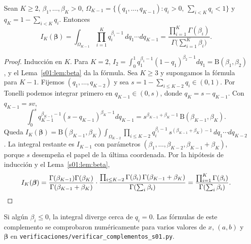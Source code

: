 \begin{teorema}\label{s01:teo:dirint}
Sean $K\ge2$, $\beta_1,\ldots,\beta_K>0$, $\Omega_{K-1}=\{(q_1,\ldots,q_{K-1}):
q_i>0,\ \sum_{i<K}q_i<1\}$ y $q_K=1-\sum_{i<K}q_i$. Entonces
\[
I_K(\boldsymbol\beta)=\int_{\Omega_{K-1}}\prod_{i=1}^Kq_i^{\beta_i-1}\,dq_1\cdots dq_{K-1}
=\frac{\prod_{i=1}^K\Gamma(\beta_i)}{\Gamma\bigl(\sum_{i=1}^K\beta_i\bigr)}.
\]
\end{teorema}
\begin{proof}
Inducción en $K$. Para $K=2$, $I_2=\int_0^1q_1^{\beta_1-1}(1-q_1)^{\beta_2-1}dq_1
=\mathrm B(\beta_1,\beta_2)$, y el Lema~\ref{s01:lem:beta} da la fórmula.
Sea $K\ge3$ y supongamos la fórmula para $K-1$. Fijemos $(q_1,\ldots,q_{K-2})$ y
sea $s=1-\sum_{i\le K-2}q_i\in(0,1)$. Por Tonelli podemos integrar primero en
$q_{K-1}\in(0,s)$, donde $q_K=s-q_{K-1}$. Con $q_{K-1}=sv$,
\[
\int_0^sq_{K-1}^{\beta_{K-1}-1}(s-q_{K-1})^{\beta_K-1}dq_{K-1}
=s^{\beta_{K-1}+\beta_K-1}\,\mathrm B(\beta_{K-1},\beta_K).
\]
Queda $I_K(\boldsymbol\beta)=\mathrm B(\beta_{K-1},\beta_K)\int_{\Omega_{K-2}}
\prod_{i\le K-2}q_i^{\beta_i-1}\,s^{(\beta_{K-1}+\beta_K)-1}\,dq_1\cdots dq_{K-2}$.
La integral restante es $I_{K-1}$ con parámetros
$(\beta_1,\ldots,\beta_{K-2},\beta_{K-1}+\beta_K)$, porque $s$ desempeña el papel
de la última coordenada. Por la hipótesis de inducción y el Lema~\ref{s01:lem:beta},
\[
I_K(\boldsymbol\beta)=\frac{\Gamma(\beta_{K-1})\Gamma(\beta_K)}{\Gamma(\beta_{K-1}+\beta_K)}
\cdot\frac{\prod_{i\le K-2}\Gamma(\beta_i)\,\Gamma(\beta_{K-1}+\beta_K)}{\Gamma(\sum_i\beta_i)}
=\frac{\prod_{i=1}^K\Gamma(\beta_i)}{\Gamma(\sum_i\beta_i)}.
\qedhere
\]
\end{proof}
\noindent Si algún $\beta_i\le0$, la integral diverge cerca de $q_i=0$. Las
fórmulas de este complemento se comprobaron numéricamente para varios valores de
$x$, $(a,b)$ y $\boldsymbol\beta$ en
\nolinkurl{verificaciones/verificar_complementos_s01.py}.

